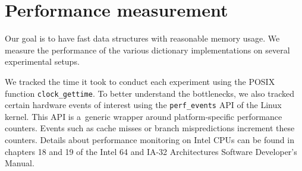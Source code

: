 \section{Performance measurement}

Our goal is to have fast data structures with reasonable memory usage.
We measure the performance of the various dictionary implementations
on several experimental setups.

We tracked the time it took to conduct each experiment using the POSIX function
\texttt{clock\_gettime}. To better understand the bottlenecks, we also
tracked certain hardware events of interest using the \texttt{perf\_events} API
of the Linux kernel. This API is a~generic wrapper around platform-specific
performance counters. Events such as cache misses or branch mispredictions
increment these counters.
Details about performance monitoring on Intel CPUs can be found in
chapters 18 and 19 of the Intel 64 and IA-32 Architectures Software
Developer’s Manual\cite{intel-manual}.

